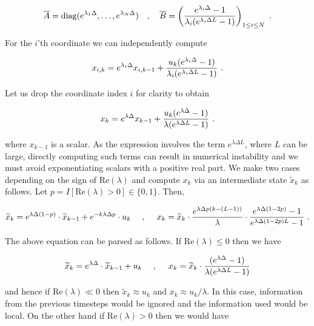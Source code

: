 \begin{equation*}
\overline{A} = \mathrm{diag}(e^{\lambda_1\Delta}, \ldots, e^{\lambda_N\Delta}) \ \ \ , \ \ \ 
\overline{B} = \left( {e^{\lambda_i\Delta} - 1 \over \lambda_i (e^{\lambda_i\Delta L} - 1)} \right)_{1\leq i \leq N} \ . 
\end{equation*}

For the $i$'th coordinate we can independently compute

\begin{equation*}
x_{i,k} = e^{\lambda_i\Delta} x_{i,k-1} + {u_k(e^{\lambda_i\Delta} - 1) \over \lambda_i (e^{\lambda_i\Delta L} - 1)} \ .
\end{equation*}

Let us drop the coordinate index $i$ for clarity to obtain

\begin{equation*}
x_{k} = e^{\lambda\Delta} x_{k-1} + {u_k(e^{\lambda\Delta} - 1) \over \lambda (e^{\lambda\Delta L} - 1)} \ .
\end{equation*}

where $x_{k-1}$ is a scalar. As the expression involves the term $e^{\lambda\Delta L}$, where $L$ can be large, directly computing such terms can result in numerical instability and we must avoid exponentiating scalars with a positive real part. We make two cases depending on the sign of $\mathrm{Re}(\lambda)$ and compute $x_k$ via an intermediate state $\widetilde{x}_{k}$ as follows. Let $p = I[\mathrm{Re}(\lambda) > 0] \in \{0,1\}$. Then,

\begin{equation*}
\widetilde{x}_{k} = e^{\lambda\Delta (1-p)}\cdot \widetilde{x}_{k-1} + e^{-k\lambda\Delta p} \cdot u_k  \ \ \ \ ,\ \ \ \ x_k = \widetilde{x}_k \cdot {e^{\lambda\Delta p (k-(L-1))} \over \lambda}\cdot {e^{\lambda\Delta (1 - 2p)}-1 \over e^{\lambda\Delta (1 - 2p) L}-1 }  \ .
\end{equation*}

The above equation can be parsed as follows. If $\mathrm{Re}(\lambda) \leq 0$ then we have

\begin{equation*}
\widetilde{x}_{k} = e^{\lambda\Delta}\cdot \widetilde{x}_{k-1} + u_k  \ \ \ \ ,\ \ \ \ x_k = \widetilde{x}_k \cdot {(e^{\lambda\Delta} - 1) \over \lambda (e^{\lambda\Delta L} - 1) }
\end{equation*}

and hence if $\mathrm{Re}(\lambda) \ll 0$ then $\widetilde{x}_k \approx u_k$ and $x_k \approx u_k / \lambda$. In this case, information from the previous timesteps would be ignored and the information used would be local. On the other hand if $\mathrm{Re}(\lambda) > 0$ then we would have

